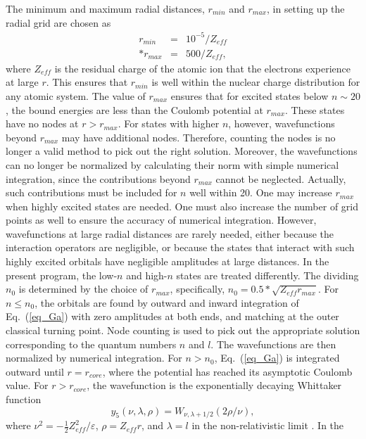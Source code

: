 \documentclass[preprint, floatfix, pra, showpacs, showkeys]{revtex4}
\begin{document}
The minimum and maximum radial distances, $r_{min}$ and $r_{max}$, in setting
up the radial grid are chosen as 
\begin{eqnarray}
r_{min} &=& 10^{-5}/Z_{eff} \nonumber \\*
r_{max} &=& 500/Z_{eff},
\end{eqnarray}
where $Z_{eff}$ is the residual charge of the atomic ion that the electrons
experience at large $r$. This ensures that $r_{min}$ is well within the
nuclear charge distribution for any atomic system. The value of
$r_{max}$ ensures that for excited states below $n \sim 20$, the bound energies
are less than the Coulomb potential at $r_{max}$. These states have no nodes at
$r > r_{max}$. For states with higher $n$, however, wavefunctions beyond
$r_{max}$ may have additional nodes. Therefore, counting the nodes is no
longer a valid method to pick out the right solution. Moreover, the
wavefunctions can no longer be normalized by calculating their norm with simple
numerical integration, since the contributions beyond $r_{max}$ cannot be
neglected. Actually, such contributions must be included for $n$ well within
20. One may increase $r_{max}$ when highly excited states are needed. One
must also increase the number of grid points as well to
ensure the accuracy of numerical integration. However, wavefunctions
at large radial distances are rarely needed, either because the interaction
operators are negligible, or because the states that interact with
such highly excited orbitals have negligible amplitudes at large distances. 
In the present program, the low-$n$ and high-$n$ states are treated
differently. The dividing $n_0$ is determined by the choice of $r_{max}$,
specifically, $n_0
= 0.5*\sqrt{Z_{eff}r_{max}}$. For $n \le n_0$, the orbitals are found by
outward and inward integration of Eq.~(\ref{eq_Ga}) with zero amplitudes at
both ends, and matching at the outer classical turning point. Node counting is
used to pick out the appropriate solution corresponding to the quantum numbers
$n$ and $l$. The wavefunctions are then normalized by 
numerical integration. For $n > n_0$, Eq.~(\ref{eq_Ga}) is integrated
outward until $r=r_{core}$, where the potential has reached its asymptotic
Coulomb value. For $r > r_{core}$, the wavefunction is the exponentially
decaying Whittaker function 
\begin{equation}
y_5(\nu, \lambda, \rho) = W_{\nu, \lambda+1/2}(2\rho/\nu),
\end{equation}
where $\nu^2 = -\frac{1}{2}Z_{eff}^2/\varepsilon$, $\rho = Z_{eff}r$, and
$\lambda = l$ in the non-relativistic limit \cite{seaton58}. In the
\end{document}
